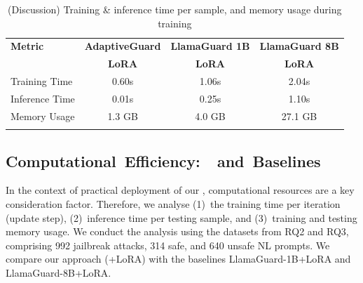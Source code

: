 
\begin{table}[h]
\centering
\vspace*{-0.5em}
\caption{(Discussion) Training \& inference time per sample, and memory usage during training}
\label{tab:computation_requirements}
\setlength{\tabcolsep}{4pt}
\begin{tabular}{lccc}
\toprule
\textbf{Metric} & \textbf{AdaptiveGuard} & \textbf{LlamaGuard 1B} & \textbf{LlamaGuard 8B} \\
 & \textbf{LoRA} & \textbf{LoRA} & \textbf{LoRA} \\
\midrule
Training Time & 0.60s & 1.06s & 2.04s \\
Inference Time & 0.01s & 0.25s & 1.10s \\
Memory Usage & 1.3 GB & 4.0 GB & 27.1 GB \\
\bottomrule
\vspace*{-1.5em}
\end{tabular}
\end{table} 

\subsection{\hbox{Computational Efficiency: \ourapp~and Baselines}}
In the context of practical deployment of our \ourapp, computational resources are a key consideration factor.
Therefore, we analyse (1)~the training time per iteration (update step), (2)~inference time per testing sample, and (3)~training and testing memory usage.
We conduct the analysis using the datasets from RQ2 and RQ3, comprising 992 jailbreak attacks, 314 safe, and 640 unsafe NL prompts.
We compare our approach (\ourapp+LoRA) with the baselines LlamaGuard-1B+LoRA and LlamaGuard-8B+LoRA.

